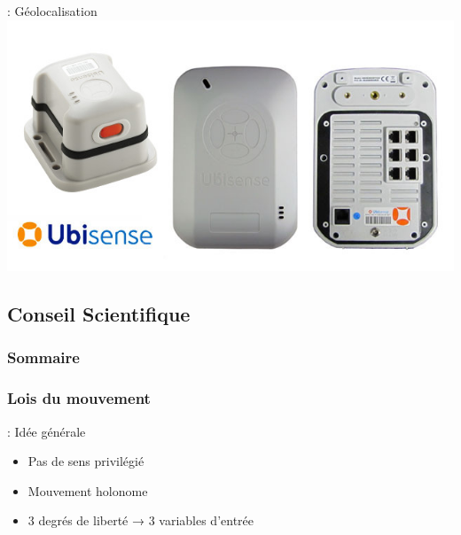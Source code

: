 \documentclass[12pt]{beamer}
\begin{document}
                \begin{frame}{\subsubsecname: Géolocalisation}
                    \includegraphics[width=\linewidth]{img/ubisense.jpg}
                \end{frame}

        \subsection{Conseil Scientifique}
            {\canvasspecial
                \begin{frame}
                    \frametitle{Sommaire}
                \tableofcontents[hideothersubsections]
            \end{frame}}
            \subsubsection{Lois du mouvement}
                \begin{frame}{\subsubsecname: Idée générale}
                    \begin{itemize}
                        \item Pas de sens privilégié
                        \item Mouvement holonome
                        \item 3 degrés de liberté → 3 variables d’entrée
                    \end{itemize}
                \end{frame}
\end{document}
